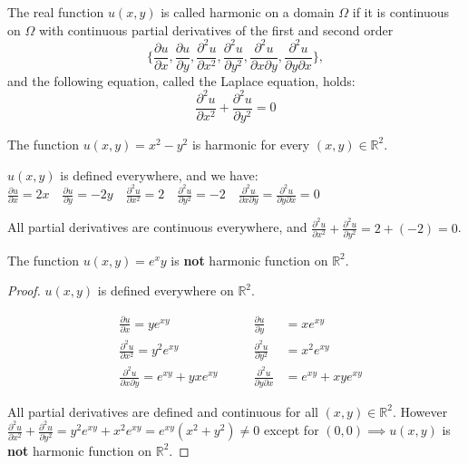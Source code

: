 \begin{definition}\label{definition:9.1} The real function $u(x,y)$ is called harmonic on a domain $\Omega$ if it is continuous on $\Omega$ with continuous partial derivatives of the first and second order 
    \[\{\frac{\partial u}{\partial x}, \frac{\partial u}{\partial y}, \frac{\partial^2 u}{\partial x^2}, \frac{\partial^2 u}{\partial y^2}, \frac{\partial^2 u}{\partial x \partial y}, \frac{\partial^2 u}{\partial y \partial x}\},\] and the following equation, called the Laplace equation, holds:
\[ \frac{\partial^2 u}{\partial x^2} + \frac{\partial^2 u}{\partial y^2} = 0 \]
\end{definition}

\begin{example}\label{example:11.1} The function $u(x,y) = x^2 - y^2$ is harmonic for every $(x,y) \in \mathbb{R}^2$.
\begin{soln}
         $u(x,y)$ is defined everywhere, and we have:
    $\frac{\partial u}{\partial x} = 2x \quad \frac{\partial u}{\partial y} = -2y \quad \frac{\partial^2 u}{\partial x^2} = 2 \quad \frac{\partial^2 u}{\partial y^2} = -2 \quad \frac{\partial^2 u}{\partial x \partial y} = \frac{\partial^2 u}{\partial y \partial x} = 0$
    
    All partial derivatives are continuous everywhere, and $\frac{\partial^2 u}{\partial x^2} + \frac{\partial^2 u}{\partial y^2} = 2 + (-2) = 0$.
\end{soln}
\end{example}

\begin{example}\label{example:11.2} The function $u(x,y) = e^x y$ is \textbf{not} harmonic function on $\mathbb{R}^2$.
\begin{proof} $u(x,y)$ is defined everywhere on $\mathbb{R}^2$.

\begin{align*}
    & \frac{\partial u}{\partial x} = ye^{xy} \qquad & \frac{\partial u}{\partial y} &= xe^{xy} \\ 
    & \frac{\partial^2 u}{\partial x^2} = y^2e^{xy} \qquad & \frac{\partial^2 u}{\partial y^2} &= x^2e^{xy} \\
    & \frac{\partial^2 u}{\partial x \partial y} = e^{xy} + yxe^{xy} \qquad & \frac{\partial^2 u}{\partial y \partial x} &= e^{xy} + xye^{xy} 
\end{align*}

All partial derivatives are defined and continuous for all $(x,y) \in \mathbb{R}^2$. However $\frac{\partial^2 u}{\partial x^2} + \frac{\partial^2 u}{\partial y^2} = y^2e^{xy} + x^2e^{xy} = e^{xy}(x^2 + y^2) \neq 0$ except for $(0,0) \implies u(x,y)$ is \textbf{not} harmonic function on $\mathbb{R}^2$.
\end{proof}
\end{example}

